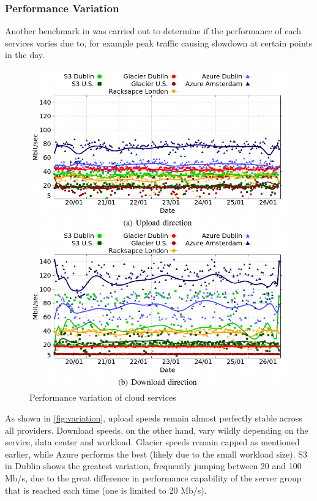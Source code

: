 \subsubsection{Performance Variation}
Another benchmark in \cite{s3vsblob_performance} was carried out to determine if the performance of each services varies due to, for example peak traffic causing slowdown at certain points in the day.
\begin{figure} [h]
    \centering
    \includegraphics[scale=0.5]{images/variation}
    \caption{\label{fig:variation}Performance variation of cloud services}
\end{figure}

As shown in \autoref{fig:variation}, upload speeds remain almost perfectly stable across all providers. Download speeds, on the other hand, vary wildly depending on the service, data center and workload. Glacier speeds remain capped as mentioned earlier, while Azure performs the best (likely due to the small workload size). S3 in Dublin shows the greatest variation, frequently jumping between 20 and 100 Mb/s, due to the great difference in performance capability of the server group that is reached each time (one is limited to 20 Mb/s).


